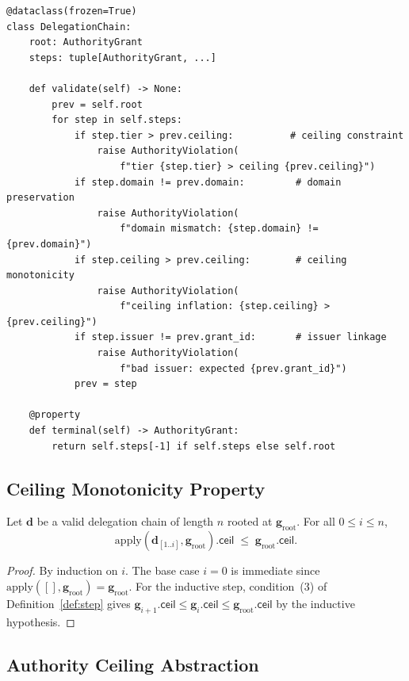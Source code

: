 \documentclass[11pt]{article}
\newcommand{\AGrant}{\mathbf{g}}            %
\newcommand{\ACeil}{\mathsf{ceil}}          %
\newcommand{\ARoot}{\mathbf{g}_{\mathrm{root}}} %
\newcommand{\DChain}{\mathbf{d}}            %
\newcommand{\DApply}{\mathrm{apply}}        %
\begin{document}
\begin{lstlisting}[style=jugeo-python, caption={DelegationChain construction and validation}]
@dataclass(frozen=True)
class DelegationChain:
    root: AuthorityGrant
    steps: tuple[AuthorityGrant, ...]

    def validate(self) -> None:
        prev = self.root
        for step in self.steps:
            if step.tier > prev.ceiling:          # ceiling constraint
                raise AuthorityViolation(
                    f"tier {step.tier} > ceiling {prev.ceiling}")
            if step.domain != prev.domain:         # domain preservation
                raise AuthorityViolation(
                    f"domain mismatch: {step.domain} != {prev.domain}")
            if step.ceiling > prev.ceiling:        # ceiling monotonicity
                raise AuthorityViolation(
                    f"ceiling inflation: {step.ceiling} > {prev.ceiling}")
            if step.issuer != prev.grant_id:       # issuer linkage
                raise AuthorityViolation(
                    f"bad issuer: expected {prev.grant_id}")
            prev = step

    @property
    def terminal(self) -> AuthorityGrant:
        return self.steps[-1] if self.steps else self.root
\end{lstlisting}

\subsection{Ceiling Monotonicity Property}

\begin{proposition}\label{prop:ceil-descent}
Let $\DChain$ be a valid delegation chain of length $n$ rooted at
$\ARoot$.  For all $0 \leq i \leq n$,
\[
  \DApply(\DChain_{[1..i]}, \ARoot).\ACeil
  \;\leq\;
  \ARoot.\ACeil.
\]
\end{proposition}
\begin{proof}
By induction on $i$.  The base case $i = 0$ is immediate since
$\DApply([], \ARoot) = \ARoot$.  For the inductive step, condition~(3)
of Definition~\ref{def:step} gives
$\AGrant_{i+1}.\ACeil \leq \AGrant_i.\ACeil \leq \ARoot.\ACeil$
by the inductive hypothesis.
\end{proof}

\subsection{Authority Ceiling Abstraction}
\end{document}
